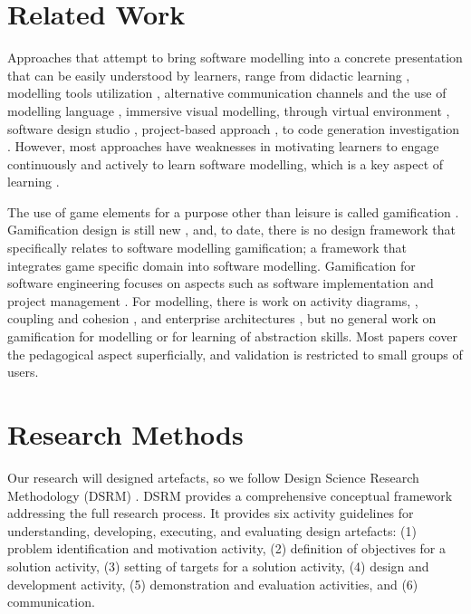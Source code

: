 \documentclass[runningheads,a4paper]{llncs}
\begin{document}
\section{Related Work}
Approaches that attempt to bring software modelling into a  concrete presentation that can be easily understood by learners, range from didactic learning \cite{moisan2009teaching}, modelling tools utilization \cite{Akayama2013}, alternative communication channels and the use of modelling language \cite{Brandsteidl2011}, immersive visual modelling, through virtual environment \cite{neubauer2003immersive}, software design studio \cite{Whittle2014}, project-based approach \cite{Szmurlo2007}, to code generation investigation \cite{schmidt2014teaching}. However, most  approaches have weaknesses in motivating learners to engage continuously and actively to learn software modelling, which is a key aspect of learning \cite{Naps2005}. %

The use of game elements for a purpose other than leisure is called gamification \cite{deterding2011game}. Gamification design is still new \cite{Deterding2013}, and, to date, there is no  design framework that specifically relates to software modelling gamification; a framework that integrates game specific domain into software modelling. %
Gamification for software engineering focuses on aspects such as software implementation and project management \cite{Pedreira2015}.  For modelling, there is work on activity diagrams, \cite{Richardsen2014}, coupling and cohesion \cite{Stikkolorum2014}, and enterprise architectures \cite{Groenewegen2010,Ionita2015}, but no general work on gamification for modelling or for learning of abstraction skills. Most papers cover the pedagogical aspect superficially, and validation is restricted to small groups of users.

\section{Research Methods}
Our research will designed artefacts, so we follow  Design Science Research Methodology (DSRM) \cite{peffers2007design}. DSRM  provides a comprehensive conceptual framework addressing the full research process. It  provides six activity guidelines for understanding, developing, executing, and evaluating design artefacts: (1) problem identification and motivation activity, (2) definition of objectives for a solution activity, (3) setting of targets for a solution activity, (4) design and development activity, (5) demonstration and evaluation activities, and (6) communication. 
\end{document}

